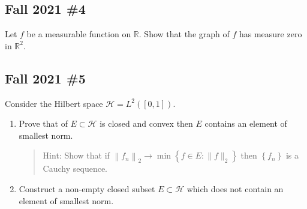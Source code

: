 \hypertarget{fall-2021-4}{%
\subsection{Fall 2021 \#4}\label{fall-2021-4}}

Let \(f\) be a measurable function on \(\mathbb{R}\). Show that the
graph of \(f\) has measure zero in \(\mathbb{R}^{2}\).

\hypertarget{fall-2021-5}{%
\subsection{Fall 2021 \#5}\label{fall-2021-5}}

Consider the Hilbert space \(\mathcal{H}=L^{2}([0,1])\).

\begin{enumerate}
\def\labelenumi{\alph{enumi}.}
\item
  Prove that of \(E \subset \mathcal{H}\) is closed and convex then
  \(E\) contains an element of smallest norm.

  \begin{quote}
  Hint: Show that if
  \(\left\|f_{n}\right\|_{2} \rightarrow \min \left\{f \in E:\|f\|_{2}\right\}\)
  then \(\left\{f_{n}\right\}\) is a Cauchy sequence.
  \end{quote}
\item
  Construct a non-empty closed subset \(E \subset \mathcal{H}\) which
  does not contain an element of smallest norm.
\end{enumerate}


\printbibliography[title=Bibliography]



